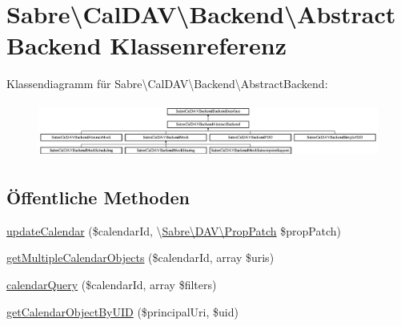 \hypertarget{class_sabre_1_1_cal_d_a_v_1_1_backend_1_1_abstract_backend}{}\section{Sabre\textbackslash{}Cal\+D\+AV\textbackslash{}Backend\textbackslash{}Abstract\+Backend Klassenreferenz}
\label{class_sabre_1_1_cal_d_a_v_1_1_backend_1_1_abstract_backend}
Klassendiagramm für Sabre\textbackslash{}Cal\+D\+AV\textbackslash{}Backend\textbackslash{}Abstract\+Backend\+:\begin{figure}[H]
\begin{center}
\leavevmode
\includegraphics[height=1.830065cm]{class_sabre_1_1_cal_d_a_v_1_1_backend_1_1_abstract_backend}
\end{center}
\end{figure}
\subsection*{Öffentliche Methoden}
\begin{DoxyCompactItemize}
\item 
\mbox{\hyperlink{class_sabre_1_1_cal_d_a_v_1_1_backend_1_1_abstract_backend_a4fcc50d31b15897b3c20f9f3d9b7409f}{update\+Calendar}} (\$calendar\+Id, \textbackslash{}\mbox{\hyperlink{class_sabre_1_1_d_a_v_1_1_prop_patch}{Sabre\textbackslash{}\+D\+A\+V\textbackslash{}\+Prop\+Patch}} \$prop\+Patch)
\item 
\mbox{\hyperlink{class_sabre_1_1_cal_d_a_v_1_1_backend_1_1_abstract_backend_adba5d18971acc5868a58d66eb9f72786}{get\+Multiple\+Calendar\+Objects}} (\$calendar\+Id, array \$uris)
\item 
\mbox{\hyperlink{class_sabre_1_1_cal_d_a_v_1_1_backend_1_1_abstract_backend_a6da1dc50d10765046142ce703bc44925}{calendar\+Query}} (\$calendar\+Id, array \$filters)
\item 
\mbox{\hyperlink{class_sabre_1_1_cal_d_a_v_1_1_backend_1_1_abstract_backend_a7b872ebd80eb25ebd9636b5d64caae8f}{get\+Calendar\+Object\+By\+U\+ID}} (\$principal\+Uri, \$uid)
\end{DoxyCompactItemize}
